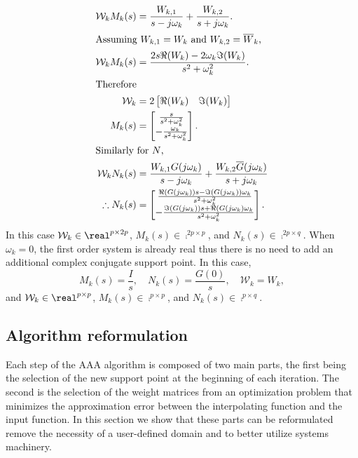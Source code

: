 \documentclass[letterpaper, 10 pt, conference]{ieeeconf}  %
\newcommand{\non}{\nonumber}
\newcommand{\mcal}[1]{\mathcal{#1}}
\begin{document}
\begin{align}
    \mcal{W}_kM_k(s) &= \frac{W_{k,1}}{s-j\omega_k} + \frac{W_{k, 2}}{s+j\omega_k}. \non \\
    \shortintertext{Assuming \(W_{k,1} = W_k\) and \(W_{k, 2} = \overline{W}_k\),}
    \mcal{W}_kM_k(s) &= \frac{2s\Re(W_k)-2\omega_k\Im(W_k)}{s^2 + \omega_k^2}. \non \\
    \shortintertext{Therefore}
    \mcal{W}_k &= 2\begin{bmatrix}\Re(W_k) & \Im(W_k)\end{bmatrix} \non \\ 
    M_k(s) &= \begin{bmatrix}\frac{s}{s^2 + \omega_k^2} \\ -\frac{\omega_k}{s^2 + \omega_k^2}\end{bmatrix}. \label{mk_eq} \\
    \shortintertext{Similarly for \(N\),}
    \mcal{W}_k N_k(s) &= \frac{W_{k, 1}G(j\omega_k)}{s-j\omega_k} + \frac{W_{k, 2}\overline{G}(j\omega_k)}{s+j\omega_k} \non \\
    \therefore N_k(s) &= \begin{bmatrix}\frac{\Re(G(j\omega_k))s - \Im(G(j\omega_k))\omega_k}{s^2+\omega_k^2} \\ -\frac{\Im(G(j\omega_k))s + \Re(G(j\omega_k)\omega_k}{s^2+\omega_k^2} \end{bmatrix}. \label{nk_eq} 
\end{align} 
In this case \(\mcal{W}_k\in\real^{p\times 2p}\), \(M_k(s)\in\comp^{2p\times p}\), and \(N_k(s)\in\comp^{2p\times q}\). When \(\omega_k=0\), the first order system is already real thus there is no need to add an additional complex conjugate support point.  In this case,
\begin{equation}
        M_k(s) = \frac{I}{s}, \quad N_k(s) = \frac{G(0)}{s}, \quad \mcal{W}_k = W_k, \label{nm0_eq}
\end{equation}
and \(\mcal{W}_k\in\real^{p\times p}\), \(M_k(s)\in\comp^{p\times p}\), and \(N_k(s)\in\comp^{p\times q}\).

\subsection{Algorithm reformulation}
Each step of the AAA algorithm is composed of two main parts, the first being the selection of the new support point at the beginning of each iteration. The second is the selection of the weight matrices from an optimization problem that minimizes the approximation error between the interpolating function and the input function.  In this section we show that these parts can be reformulated remove the necessity of a user-defined domain and to better utilize systems machinery.  
\end{document}
